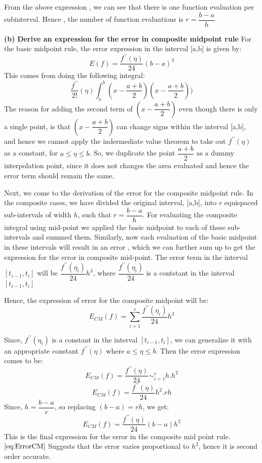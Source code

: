 \documentclass{article}
\renewcommand\part[1]{\vspace{.10in}\textbf{(#1)}}
\begin{document}
  From the above expression , we can see that there is one function evaluation per subinterval. Hence , the number of function evaluations is $r = \dfrac{b-a}{h}$ \newline

  \part{b} \textbf {Derive an expression for the error in composite midpoint rule} \newline
  For the basic midpoint rule, the error expression in the interval [a,b] is given by:
  \[E(f) = \dfrac{f^{\prime\prime}(\eta)}{24}(b-a)^3\]
  This comes from doing the following integral:
  \[\dfrac{f^{\prime\prime}}{2!}(\eta)\int_{a}^{b}(x - \dfrac{a+b}{2})(x - \dfrac{a+b}{2})) \]
  The reason for adding the second term of $(x - \dfrac{a+b}{2})$ even though there is only a single point, is that $(x - \dfrac{a+b}{2})$ can change signs within the interval [a,b], and hence we cannot apply the indermediate value theorem to take out $f^{\prime\prime}(\eta)$ as a constant, for $a \leq \eta \leq b$. So, we duplicate the point $\dfrac{a+b}{2}$ as a dummy interpolation point, since it does not changes the area evaluated and hence the error term should remain the same. \newline

  Next, we come to the derivation of the error for the composite midpoint rule. In the composite cases, we have divided the original interval, [a,b], into $r$ equispaced sub-intervals of width $h$, such that $r = \dfrac{b-a}{h}$. For evaluating the composite integral using mid-point we applied the basic midpoint to each of these sub-intervals and summed them. Similarly, now each evaluation of the basic midpoint in these intervals will result in an error , which we can further sum up to get the expression for the error in composite mid-point. The error term in the interval $[t_{i-1},t_i]$ will be $\dfrac{f^{\prime\prime}(\eta_i)}{24}h^3$, where $\dfrac{f^{\prime\prime}(\eta_i)}{24}$ is a contstant in the interval $[t_{i-1},t_i]$
  

  Hence, the expression of error for the composite midpoint will be:
  \[E_{CM}(f) = \sum_{i=1}^r \dfrac{f^{\prime\prime}(\eta_i)}{24}h^3\]

  Since, $f^{\prime\prime}(\eta_i)$ is a constant in the interval $[t_{i-1},t_i]$, we can generalize it with an appropriate constant $f^{\prime\prime}(\eta)$ where $a \leq \eta \leq b$. Then the error expression comes to be:
  \[ E_{CM}(f) = \dfrac{f^{\prime\prime}(\eta)}{24} \sim_{i=1}^{r} h.h^2\]
  \[ E_{CM}(f) = \dfrac{f^{\prime\prime}(\eta)}{24} h^2.rh\]
  Since, $h = \dfrac{b-a}{r}$, so replacing $(b-a) = rh$, we get:
  \begin{equation}
   E_{CM}(f) = \dfrac{f^{\prime\prime}(\eta)}{24}(b-a)h^2
   \label{eq:ErrorCM}
  \end{equation}
  This is the final expression for the error in the composite mid point rule. \newline
  $\eqref{eq:ErrorCM}$ Suggests that the error varies proportional to $h^2$, hence it is second order accurate. 
\end{document}
